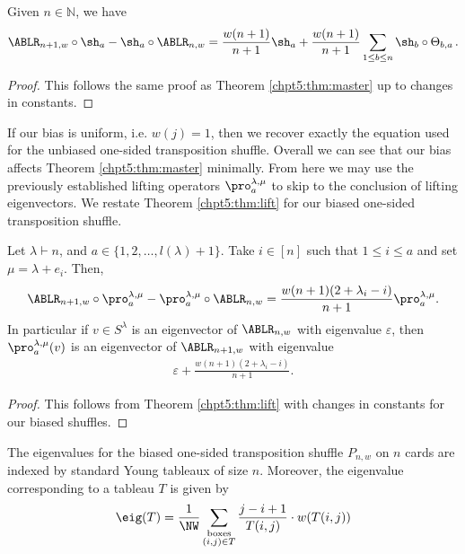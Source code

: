 \documentclass[11pt]{report}
\begin{document}
\begin{thm}
	\label{chpt5:thm:biasedmaster}
	Given $n \in \mathbb{N}$, we have
	\begin{equation}
	\ABLR_{n+1,w} \circ \sh_{a} - \sh_{a} \circ \ABLR_{n,w} = 
	\frac{w(n+1)}{n+1}\sh_{a} + 
	\frac{w(n+1)}{n+1}\sum_{1 \leq b \leq n} \sh_{b}\circ\Theta_{b,a} \,. 
	\label{chpt5:eqn:biasedmastereq}
	\end{equation}
\end{thm}
\begin{proof}
	This follows the same proof as Theorem \ref{chpt5:thm:master} up to changes in constants.
\end{proof}

If our bias is uniform, i.e. $w(j)=1$, then we recover exactly the equation used for the unbiased one-sided transposition shuffle. Overall we can see that our bias affects Theorem \ref{chpt5:thm:master} minimally. From here we may use the previously established lifting operators $\pro_{a}^{\lambda, \mu}$ to skip to the conclusion of lifting eigenvectors. We restate Theorem \ref{chpt5:thm:lift} for our biased one-sided transposition shuffle.


\begin{thm}
	\label{chpt5:thm:biasedlifting}
	
	
	Let $\lambda \vdash n$, and  $a \in \{1,2,\ldots,l(\lambda)+1\}$. Take $i\in [n]$ such that  $1 \leq i \leq a$ and set $\mu = \lambda +e_{i}$. Then,
	\begin{eqnarray}
	\ABLR_{n+1,w} \circ \pro_{a}^{\lambda,\mu} - 
	\pro_{a}^{\lambda,\mu} \circ \ABLR_{n,w} = \frac{w(n+1)(2 + 
		\lambda_{i} -i)}{n+1}\pro_{a}^{\lambda,\mu} .
	\end{eqnarray}
	In particular if $v \in S^{\lambda}$ is an eigenvector of $\ABLR_{n,w}$ 
	with 
	eigenvalue $\varepsilon$, then  
	$\pro_{a}^{\lambda,\mu}(v)$ is an eigenvector of 
	$\ABLR_{n+1,w}$ with eigenvalue 
	\begin{eqnarray}
	\varepsilon + \frac{w(n+1)(2 +\lambda_{i} -i )}{n+1}.
	\end{eqnarray}
\end{thm}
\begin{proof}
	This follows from Theorem \ref{chpt5:thm:lift} with changes in constants for our biased shuffles.
\end{proof}


\begin{lemma}
	\label{biasedCompute}
	The eigenvalues for the biased one-sided transposition shuffle $P_{n,w}$ on $n$ cards 
	are indexed by standard Young tableaux of size $n$. Moreover, the 
	eigenvalue corresponding to a tableau $T$ is given by
	\begin{eqnarray*}
		\label{eigenvaluesum2}
		\eig(T) = \frac{1}{\NW}\sum_{\substack{\textnormal{boxes}\\ 
				(i,j) \in T}} 
		\frac{j-i+1}{T(i,j)} \cdot w(T(i,j))
	\end{eqnarray*}
\end{lemma}
\end{document}

